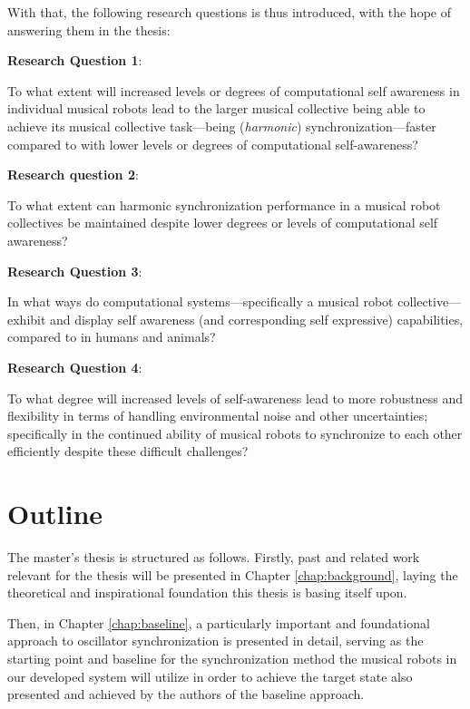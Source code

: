 With that, the following research questions is thus introduced, with the hope of answering them in the thesis: \nl

\textbf{Research Question 1}:

To what extent will increased levels or degrees of computational self awareness in individual musical robots lead to the larger musical collective being able to achieve its musical collective task—being (\textit{harmonic}) synchronization—faster compared to with lower levels or degrees of computational self-awareness? \nl

\textbf{Research question 2}:

To what extent can harmonic synchronization performance in a musical robot collectives be maintained despite lower degrees or levels of computational self awareness? \nl

\textbf{Research Question 3}:

In what ways do computational systems—specifically a musical robot collective—exhibit and display self awareness (and corresponding self expressive) capabilities, compared to in humans and animals? \nl


\textbf{Research Question 4}:

To what degree will increased levels of self-awareness lead to more robustness and flexibility in terms of handling environmental noise and other uncertainties; specifically in the continued ability of musical robots to synchronize to each other efficiently despite these difficult challenges? \nl




\section{Outline}

The master's thesis is structured as follows. Firstly, past and related work relevant for the thesis will be presented in Chapter \ref{chap:background}, laying the theoretical and inspirational foundation this thesis is basing itself upon.

Then, in Chapter \ref{chap:baseline}, a particularly important and foundational approach to oscillator synchronization is presented in detail, serving as the starting point and baseline for the synchronization method the musical robots in our developed system will utilize in order to achieve the target state also presented and achieved by the authors of the baseline approach.

